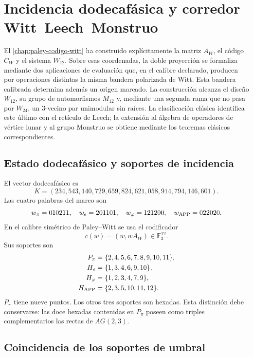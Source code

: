 \chapter{Incidencia dodecafásica y corredor Witt--Leech--Monstruo}
\label{chap:bandera-excepcional-acumulativa}

El \cref{chap:paley-codigo-witt} ha construido explícitamente la matriz
\(A_W\), el código \(C_W\) y el sistema \(W_{12}\). Sobre esas coordenadas,
la doble proyección se formaliza mediante dos aplicaciones de evaluación que,
en el calibre declarado, producen por operaciones distintas la misma bandera
polarizada de Witt. Esta bandera calibrada determina además un origen marcado. La
construcción alcanza el diseño \(W_{12}\), su grupo de automorfismos
\(M_{12}\) y, mediante una segunda rama que no pasa por \(W_{24}\), un
3-vecino par unimodular sin raíces. La clasificación clásica identifica este
último con el retículo de Leech; la extensión al álgebra de operadores de
vértice lunar y al grupo Monstruo se obtiene mediante los teoremas clásicos
correspondientes.

\section{Estado dodecafásico y soportes de incidencia}

El vector dodecafásico es
\[
K=(234,543,140,729,659,824,621,058,914,794,146,601).
\]
Las cuatro palabras del marco son
\[
w_\pi=010211,
\quad
w_e=201101,
\quad
w_\varphi=121200,
\quad
w_{\rm APP}=022020.
\]
En el calibre simétrico de Paley--Witt se usa el codificador
\[
c(w)=(w,wA_W)\in\mathbb F_3^{12}.
\]
Sus soportes son
\[
\begin{aligned}
P_\pi&=\{2,4,5,6,7,8,9,10,11\},\\
H_e&=\{1,3,4,6,9,10\},\\
H_\varphi&=\{1,2,3,4,7,9\},\\
H_{\rm APP}&=\{2,3,5,10,11,12\}.
\end{aligned}
\]
\(P_\pi\) tiene nueve puntos. Los otros tres soportes son hexadas. Esta
distinción debe conservarse: las doce hexadas contenidas en \(P_\pi\) poseen
como triples complementarios las rectas de \(AG(2,3)\).

\section{Coincidencia de los soportes de umbral}

